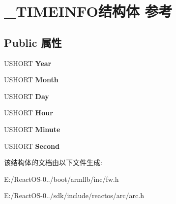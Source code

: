 \hypertarget{struct___t_i_m_e_i_n_f_o}{}\section{\+\_\+\+T\+I\+M\+E\+I\+N\+F\+O结构体 参考}
\label{struct___t_i_m_e_i_n_f_o}
\subsection*{Public 属性}
\begin{DoxyCompactItemize}
\item 
\mbox{\label{struct___t_i_m_e_i_n_f_o_aed0cd51dc73dbe48947477357b4ce0c2}} 
U\+S\+H\+O\+RT {\bfseries Year}
\item 
\mbox{\label{struct___t_i_m_e_i_n_f_o_a373e2a9bbbc5ac896fcaaad879573d37}} 
U\+S\+H\+O\+RT {\bfseries Month}
\item 
\mbox{\label{struct___t_i_m_e_i_n_f_o_a8b977551131c8de17010d17a10a1acfa}} 
U\+S\+H\+O\+RT {\bfseries Day}
\item 
\mbox{\label{struct___t_i_m_e_i_n_f_o_acceed5bc3f4e4fdd4bd51a8681bb9009}} 
U\+S\+H\+O\+RT {\bfseries Hour}
\item 
\mbox{\label{struct___t_i_m_e_i_n_f_o_a9175d0fdff338b4b8b14ea4f4e182a24}} 
U\+S\+H\+O\+RT {\bfseries Minute}
\item 
\mbox{\label{struct___t_i_m_e_i_n_f_o_adc3c4f10ec0324a5cb598cac1df2ae53}} 
U\+S\+H\+O\+RT {\bfseries Second}
\end{DoxyCompactItemize}


该结构体的文档由以下文件生成\+:\begin{DoxyCompactItemize}
\item 
E\+:/\+React\+O\+S-\/0../boot/armllb/inc/fw.\+h\item 
E\+:/\+React\+O\+S-\/0../sdk/include/reactos/arc/arc.\+h\end{DoxyCompactItemize}
